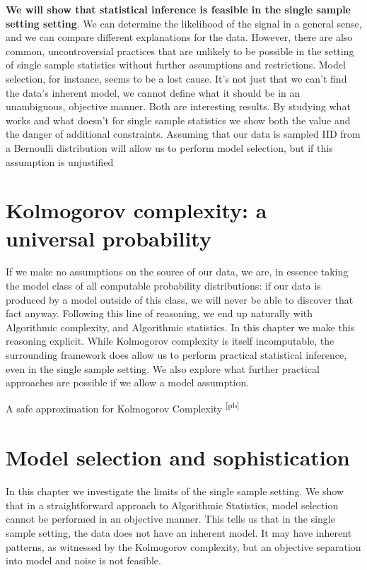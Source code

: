 \documentclass{thesis}
\newcommand{\pb}[1]{\textcolor{OliveGreen}{\small #1 \textsuperscript{[pb]} }}
\begin{document}
\textbf{We will show that statistical inference is feasible in the single sample setting setting}. We can determine the likelihood of the signal in a general sense, and we can compare different explanations for the data. However, there are also common, uncontroversial practices that are unlikely to be possible in the setting of single sample statistics without further assumptions and restrictions. Model selection, for instance, seems to be a lost cause. It's not just that we can't find the data's inherent model, we cannot define what it should be in an unambiguous, objective manner. Both are interesting results. By studying what works and what doesn't for single sample statistics we show both the value and the danger of additional constraints. Assuming that our data is sampled IID from a Bernoulli distribution will allow us to perform model selection, but if this assumption is unjustified 


\chapter{Kolmogorov complexity: a universal probability}

\begin{summary}If we make no assumptions on the source of our data, we are, in essence taking the model class of all computable probability distributions: if our data is produced by a model outside of this class, we will never be able to discover that fact anyway. Following this line of reasoning, we end up naturally with Algorithmic complexity, and Algorithmic statistics. In this chapter we make this reasoning explicit. While Kolmogorov complexity is itself incomputable, the surrounding framework does allow us to perform practical statistical inference, even in the single sample setting. We also explore what further practical approaches are possible if we allow a model assumption.
\end{summary}

\pb{A safe approximation for Kolmogorov Complexity}

\chapter{Model selection and sophistication}

\begin{summary}In this chapter we investigate the limits of the single sample setting. We show that in a  straightforward approach to Algorithmic Statistics, model selection cannot be performed in an objective manner. This tells us that in the single sample setting, the data does not have an inherent model. It may have inherent patterns, as witnessed by the Kolmogorov complexity, but an objective separation into model and noise is not feasible. 
\end{summary}
\end{document}
